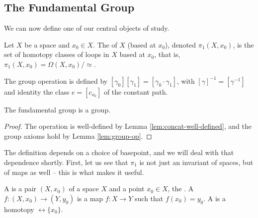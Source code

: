 \subsection{The Fundamental Group}

We can now define one of our central objects of study.

\begin{definition}
	Let $X$ be a space and $x_0 \in X$. The  of $X$ (based at $x_0$), denoted $\pi_1(X, x_0)$, is the set of homotopy classes of loops in $X$ based at $x_0$, that is, $\pi_1(X, x_0) = \Omega(X, x_0)/\simeq$.

	The group operation is defined by $[\gamma_0][\gamma_1] = [\gamma_0 \cdot \gamma_1]$, with $[\gamma]^{-1} = [\gamma^{-1}]$ and identity the class $e = [c_{x_0}]$ of the constant path.
\end{definition}

\begin{theorem}
	The fundamental group is a group.
\end{theorem}
\begin{proof}
	The operation is well-defined by Lemma \ref{lem:concat-well-defined}, and the group axioms hold by Lemma \ref{lem:group-op}.
\end{proof}

The definition depends on a choice of basepoint, and we will deal with that dependence
shortly. First, let us see that $\pi_1$ is not just an invariant of spaces, but of maps
as well -- this is what makes it useful.

\begin{definition}
	A  is a pair $(X, x_0)$ of a space $X$ and a point $x_0 \in X$, the . A  $f: (X, x_0) \rightarrow (Y, y_0)$ is a map $f: X \rightarrow Y$ such that $f(x_0) = y_0$. A  is a homotopy $\rel \{x_0\}$.
\end{definition}


